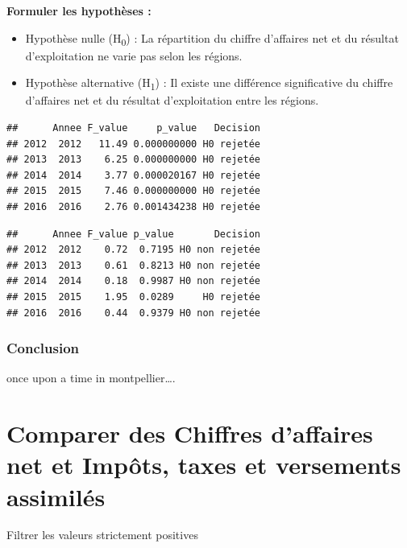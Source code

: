 \documentclass[mstat,12pt]{unswthesis}
\begin{document}
\medskip

\textbf{Formuler les hypothèses :}

\bigskip

\begin{itemize}
\tightlist
\item
  Hypothèse nulle (H\textsubscript{0}) : La répartition du chiffre
  d'affaires net et du résultat d'exploitation ne varie pas selon les
  régions. \medskip
\item
  Hypothèse alternative (H\textsubscript{1}) : Il existe une différence
  significative du chiffre d'affaires net et du résultat d'exploitation
  entre les régions.
\end{itemize}

\begin{verbatim}
##      Annee F_value     p_value   Decision
## 2012  2012   11.49 0.000000000 H0 rejetée
## 2013  2013    6.25 0.000000000 H0 rejetée
## 2014  2014    3.77 0.000020167 H0 rejetée
## 2015  2015    7.46 0.000000000 H0 rejetée
## 2016  2016    2.76 0.001434238 H0 rejetée
\end{verbatim}

\bigskip

\begin{verbatim}
##      Annee F_value p_value       Decision
## 2012  2012    0.72  0.7195 H0 non rejetée
## 2013  2013    0.61  0.8213 H0 non rejetée
## 2014  2014    0.18  0.9987 H0 non rejetée
## 2015  2015    1.95  0.0289     H0 rejetée
## 2016  2016    0.44  0.9379 H0 non rejetée
\end{verbatim}

\subsubsection{Conclusion}\label{conclusion-2}

once upon a time in montpellier\ldots.

\newpage

\section{\texorpdfstring{\textbf{Comparer des Chiffres d'affaires net et
Impôts, taxes et versements
assimilés}}{Comparer des Chiffres d'affaires net et Impôts, taxes et versements assimilés}}\label{comparer-des-chiffres-daffaires-net-et-impuxf4ts-taxes-et-versements-assimiluxe9s}

\medskip

Filtrer les valeurs strictement positives
\end{document}
